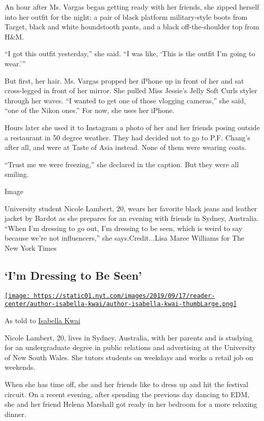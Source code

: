 An hour after Ms. Vargas began getting ready with her friends, she
zipped herself into her outfit for the night: a pair of black platform
military-style boots from Target, black and white houndstooth pants, and
a black off-the-shoulder top from H\&M.

``I got this outfit yesterday,'' she said. ``I was like, `This is the
outfit I'm going to wear.'''

But first, her hair. Ms. Vargas propped her iPhone up in front of her
and sat cross-legged in front of her mirror. She pulled Miss Jessie's
Jelly Soft Curls styler through her waves. ``I wanted to get one of
those vlogging cameras,'' she said, ``one of the Nikon ones.'' For now,
she uses her iPhone.

Hours later she used it to Instagram a photo of her and her friends
posing outside a restaurant in 50 degree weather. They had decided not
to go to P.F. Chang's after all, and were at Taste of Asia instead. None
of them were wearing coats.

``Trust me we were freezing,'' she declared in the caption. But they
were all smiling.

Image

University student Nicole Lambert, 20, wears her favorite black jeans
and leather jacket by Bardot as she prepares for an evening with friends
in Sydney, Australia. ``When I'm dressing to go out, I'm dressing to be
seen, which is weird to say because we're not influencers,'' she
says.Credit...Lisa Maree Williams for The New York Times

\hypertarget{im-dressing-to-be-seen}{%
\subsection{`I'm Dressing to Be Seen'}\label{im-dressing-to-be-seen}}

\href{https://www.nytimes.com/by/isabella-kwai}{\texttt{[image: https://static01.nyt.com/images/2019/09/17/reader-center/author-isabella-kwai/author-isabella-kwai-thumbLarge.png]}}

As told to \href{https://www.nytimes.com/by/isabella-kwai}{Isabella
Kwai}

Nicole Lambert, 20, lives in Sydney, Australia, with her parents and is
studying for an undergraduate degree in public relations and advertising
at the University of New South Wales. She tutors students on weekdays
and works a retail job on weekends.

When she has time off, she and her friends like to dress up and hit the
festival circuit. On a recent evening, after spending the previous day
dancing to EDM, she and her friend Helena Marshall got ready in her
bedroom for a more relaxing dinner.

